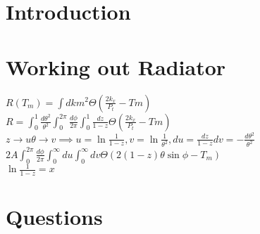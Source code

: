 \documentclass[12pt,twoside]{article}
\begin{document}



\section{Introduction}

\section{Working out Radiator}
$R(T_m) = \int dk m^2 \Theta \left(\frac{2k_x}{P_t} - Tm\right)$\\
$R = \int_{0}^{1} \frac{d \theta ^2}{\theta ^2} \int_{0}^{2\pi} \frac{d\phi}{2\pi} \int_{0}^{1} \frac{dz}{1-z} \Theta \left(\frac{2k_x}{P_t} - Tm\right)$\\
$z \to u\theta \to v \implies u = \ln{\frac{1}{1-z}}, v = \ln{\frac{1}{\theta ^2}}, du = \frac{dz}{1-z} dv = -\frac{d\theta^2}{\theta^2}$ \\
$2A \int_{0}^{2\pi} \frac{d\phi}{2\pi} \int_{0}^{\infty} du \int_{0}^{\infty} dv \Theta (2(1-z)\theta \sin{\phi} - T_m) $ \\
$\ln{\frac{1}{1-z}} =x$

\section{Questions}
\end{document}
